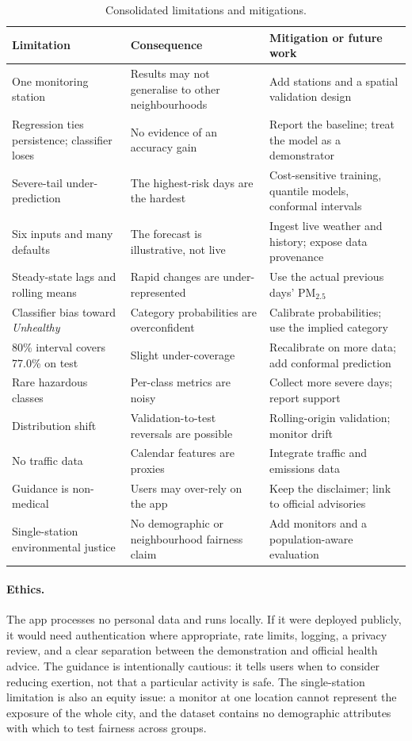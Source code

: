 \begin{table}[htbp]
\centering
\footnotesize
\begin{tabular}{@{}L{3.8cm}L{5.7cm}L{5.5cm}@{}}
\toprule
\textbf{Limitation} & \textbf{Consequence} & \textbf{Mitigation or future work} \\
\midrule
One monitoring station & Results may not generalise to other neighbourhoods &
Add stations and a spatial validation design \\
Regression ties persistence; classifier loses & No evidence of an accuracy gain &
Report the baseline; treat the model as a demonstrator \\
Severe-tail under-prediction & The highest-risk days are the hardest &
Cost-sensitive training, quantile models, conformal intervals \\
Six inputs and many defaults & The forecast is illustrative, not live &
Ingest live weather and history; expose data provenance \\
Steady-state lags and rolling means & Rapid changes are under-represented &
Use the actual previous days' PM$_{2.5}$ \\
Classifier bias toward \emph{Unhealthy} & Category probabilities are overconfident &
Calibrate probabilities; use the implied category \\
80\% interval covers 77.0\% on test & Slight under-coverage &
Recalibrate on more data; add conformal prediction \\
Rare hazardous classes & Per-class metrics are noisy &
Collect more severe days; report support \\
Distribution shift & Validation-to-test reversals are possible &
Rolling-origin validation; monitor drift \\
No traffic data & Calendar features are proxies &
Integrate traffic and emissions data \\
Guidance is non-medical & Users may over-rely on the app &
Keep the disclaimer; link to official advisories \\
Single-station environmental justice & No demographic or neighbourhood fairness claim &
Add monitors and a population-aware evaluation \\
\bottomrule
\end{tabular}
\caption{Consolidated limitations and mitigations.}
\label{tab:limitations-d3}
\end{table}

\paragraph{Ethics.} The app processes no personal data and runs locally. If it
were deployed publicly, it would need authentication where appropriate, rate
limits, logging, a privacy review, and a clear separation between the
demonstration and official health advice. The guidance is intentionally
cautious: it tells users when to consider reducing exertion, not that a
particular activity is safe. The single-station limitation is also an equity
issue: a monitor at one location cannot represent the exposure of the whole
city, and the dataset contains no demographic attributes with which to test
fairness across groups.

